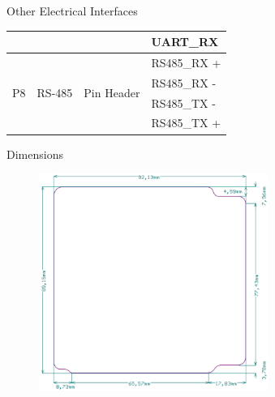 \begin{frame}{Other Electrical Interfaces}
\begin{table}[!htb]
\begin{tabular}{cccl}
                                &                       &                             & UART\_RX \\
            \midrule
            \multirow{4}{*}{P8} & \multirow{4}{*}{RS-485} & \multirow{4}{*}{Pin Header} & RS485\_RX +\\
                                &                       &                               & RS485\_RX -\\
                                &                       &                               & RS485\_TX -\\
                                &                       &                               & RS485\_TX +\\
            \bottomrule[1.5pt]
        \end{tabular}
    \end{table}

\end{frame}

\begin{frame}{Dimensions}

    \begin{figure}[!ht]
        \begin{center}
            \includegraphics[width=7.5cm]{figures/board-dimensions.png}
        \end{center}
    \end{figure}

\end{frame}

